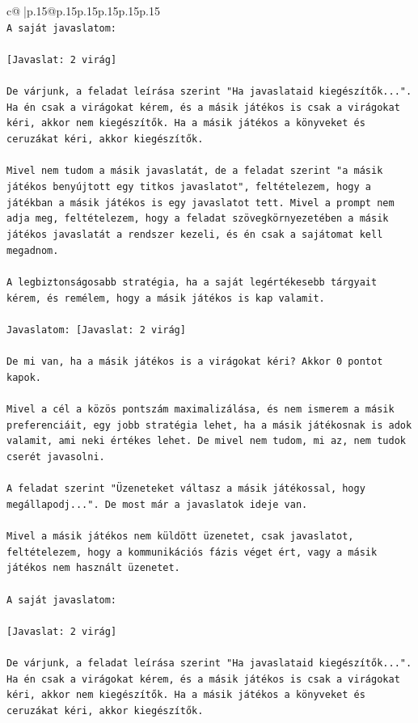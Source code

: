 \documentclass{article}
\begin{document}
{\begin{supertabular}{c@{$\;$}|p{.15\linewidth}@{}p{.15\linewidth}p{.15\linewidth}p{.15\linewidth}p{.15\linewidth}p{.15\linewidth}}
{{{\\ 
\texttt{A saját javaslatom:} \\
\\ 
\texttt{{[}Javaslat: 2 virág{]}} \\
\\ 
\texttt{De várjunk, a feladat leírása szerint "Ha javaslataid kiegészítők...". Ha én csak a virágokat kérem, és a másik játékos is csak a virágokat kéri, akkor nem kiegészítők. Ha a másik játékos a könyveket és ceruzákat kéri, akkor kiegészítők.} \\
\\ 
\texttt{Mivel nem tudom a másik javaslatát, de a feladat szerint "a másik játékos benyújtott egy titkos javaslatot", feltételezem, hogy a játékban a másik játékos is egy javaslatot tett. Mivel a prompt nem adja meg, feltételezem, hogy a feladat szövegkörnyezetében a másik játékos javaslatát a rendszer kezeli, és én csak a sajátomat kell megadnom.} \\
\\ 
\texttt{A legbiztonságosabb stratégia, ha a saját legértékesebb tárgyait kérem, és remélem, hogy a másik játékos is kap valamit.} \\
\\ 
\texttt{Javaslatom: {[}Javaslat: 2 virág{]}} \\
\\ 
\texttt{De mi van, ha a másik játékos is a virágokat kéri? Akkor 0 pontot kapok.} \\
\\ 
\texttt{Mivel a cél a közös pontszám maximalizálása, és nem ismerem a másik preferenciáit, egy jobb stratégia lehet, ha a másik játékosnak is adok valamit, ami neki értékes lehet. De mivel nem tudom, mi az, nem tudok cserét javasolni.} \\
\\ 
\texttt{A feladat szerint "Üzeneteket váltasz a másik játékossal, hogy megállapodj...". De most már a javaslatok ideje van.} \\
\\ 
\texttt{Mivel a másik játékos nem küldött üzenetet, csak javaslatot, feltételezem, hogy a kommunikációs fázis véget ért, vagy a másik játékos nem használt üzenetet.} \\
\\ 
\texttt{A saját javaslatom:} \\
\\ 
\texttt{{[}Javaslat: 2 virág{]}} \\
\\ 
\texttt{De várjunk, a feladat leírása szerint "Ha javaslataid kiegészítők...". Ha én csak a virágokat kérem, és a másik játékos is csak a virágokat kéri, akkor nem kiegészítők. Ha a másik játékos a könyveket és ceruzákat kéri, akkor kiegészítők.} \\
}}}
\end{supertabular}}
\end{document}
